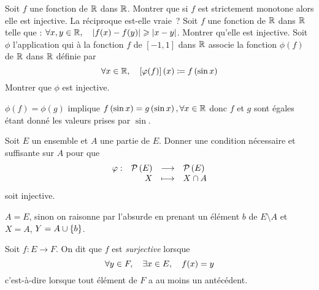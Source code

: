 \documentclass{magnoliaold}
\begin{document}
\begin{exos}
\exo Soit $f$ une fonction de $\mathbb{R}$ dans $\mathbb{R}$. Montrer que si $f$ est
  strictement monotone alors elle est injective. La réciproque est-elle vraie~?
\exo Soit $f$ une fonction de $\mathbb{R}$ dans $\mathbb{R}$ telle que :
  $\forall x,y\in\mathbb{R} ,\quad \left|f(x)-f(y)\right|\geqslant\left|x-y\right|$. Montrer qu'elle est
  injective.
\exo Soit $\phi$ l'application qui à la fonction $f$ de
  $[-1,1]$ dans $\mathbb{R}$ associe la fonction $\phi(f)$ de $\mathbb{R}$ dans $\mathbb{R}$
  définie par
  \[\forall x\in\mathbb{R} ,\quad \left[\varphi(f)\right](x)\coloneqq f\left(\sin x\right)\]
  Montrer que $\phi$ est injective.
  \begin{sol}
  $\phi(f)=\phi(g)$ implique $f\left(\sin x\right)=g\left(\sin x\right), \forall x\in\mathbb{R}$ donc $f$ et $g$ sont égales étant donné les valeurs prises par $\sin$.
  \end{sol}
\exo Soit $E$ un ensemble et $A$ une partie de $E$. Donner une condition
  nécessaire et suffisante sur $A$ pour que
  \[\begin{array}[t]{lrcl} \displaystyle{\varphi} : & \displaystyle{\mathcal{P}\left(E\right)} & \longrightarrow & \displaystyle{\mathcal{P}\left(E\right)} \\ & \displaystyle{X} & \longmapsto & \displaystyle{X\cap A} \end{array}\]
  soit injective.
  \begin{sol}
  $A=E$, sinon on raisonne par l'absurde en prenant un élément $b$ de $E\setminus A$ et $X=A$, $Y=A\cup \left\{b\right\}$.
  \end{sol}
\end{exos}


\begin{definition}[utile=-3]
Soit $f:E\to F$. On dit que $f$ est \emph{surjective} lorsque
\[\forall y\in F ,\quad \exists x\in E ,\quad f(x)=y\]
c'est-à-dire lorsque tout élément de $F$ a au moins un antécédent.
\end{definition}

\end{document}
